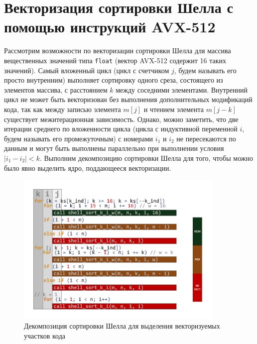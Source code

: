 \documentclass[utf8]{psta}
\begin{document}
\section{Векторизация сортировки Шелла с помощью инструкций AVX-512}

Рассмотрим возможности по векторизации сортировки Шелла для массива вещественных значений типа \texttt{float} (вектор AVX-512 содержит 16 таких значений). 
Самый вложенный цикл (цикл с счетчиком $j$, будем называть его просто внутренним) выполняет сортировку одного среза, состоящего из элементов массива, с расстоянием $k$ между соседними элементами.
Внутренний цикл не может быть векторизован без выполнения дополнительных модификаций кода, так как между записью элемента $m[j]$ и чтением элемента $m[j - k]$ существует межитерационная зависимость. 
Однако, можно заметить, что две итерации среднего по вложенности цикла (цикла с индуктивной переменной $i$, будем называть его промежуточным) с номерами $i_1$ и $i_2$ не пересекаются по данным и могут быть выполнены параллельно при выполнении условия $|i_1 - i_2| < k$. 
Выполним декомпозицию сортировки Шелла для того, чтобы можно было явно выделить ядро, поддающееся векторизации.

\begin{figure}
\includegraphics[width=10cm]{pics/pic_decomposition}
\caption{Декомпозиция сортировки Шелла для выделения векторизуемых участков кода}
\label{pic:decomposition}
\end{figure}
\end{document}
